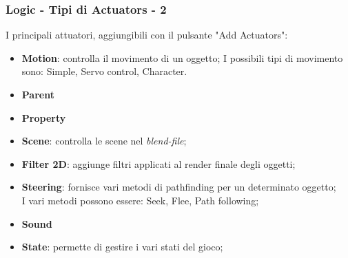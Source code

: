 \documentclass{beamer}
\begin{document}
				\begin{frame}
			\frametitle{Logic - Tipi di Actuators - 2}
			I principali attuatori, aggiungibili con il pulsante "Add Actuators":
			\begin{itemize}
				\item \textbf{Motion}: {\footnotesize controlla il movimento di un oggetto; I possibili tipi di movimento sono: Simple, Servo control, Character.}
				\item \textbf{Parent}
				\item \textbf{Property}
				\item \textbf{Scene}: {\footnotesize controlla le scene nel \textit{blend-file};}
				\item \textbf{Filter 2D}: {\footnotesize aggiunge filtri applicati al render finale degli oggetti;}
				\item \textbf{Steering}: {\footnotesize fornisce vari metodi di pathfinding per un determinato oggetto;\\I vari metodi possono essere: Seek, Flee, Path following;}
				\item \textbf{Sound}
				\item \textbf{State}: {\footnotesize permette di gestire i vari stati del gioco;}
			\end{itemize}
		\end{frame}
		
\end{document}
